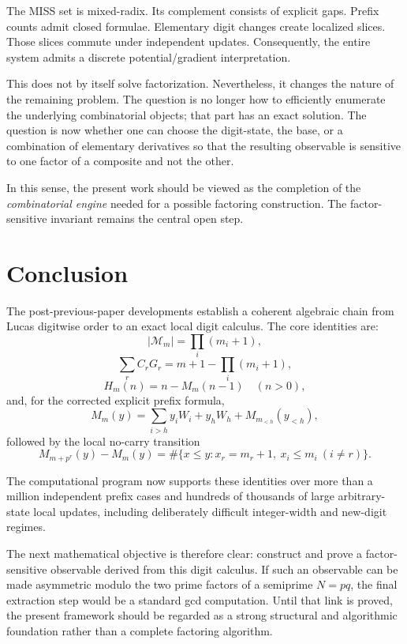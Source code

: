 \documentclass[11pt,a4paper]{article}
\theoremstyle{definition}
\theoremstyle{remark}
\newcommand{\Miss}{\mathcal M}
\begin{document}
The MISS set is mixed-radix.  Its complement consists of explicit gaps.  Prefix counts admit closed formulae.  Elementary digit changes create localized slices.  Those slices commute under independent updates.  Consequently, the entire system admits a discrete potential/gradient interpretation.

This does not by itself solve factorization.  Nevertheless, it changes the nature of the remaining problem.  The question is no longer how to efficiently enumerate the underlying combinatorial objects; that part has an exact solution.  The question is now whether one can choose the digit-state, the base, or a combination of elementary derivatives so that the resulting observable is sensitive to one factor of a composite and not the other.

In this sense, the present work should be viewed as the completion of the \emph{combinatorial engine} needed for a possible factoring construction.  The factor-sensitive invariant remains the central open step.

\section{Conclusion}

The post-previous-paper developments establish a coherent algebraic chain from Lucas digitwise order to an exact local digit calculus.  The core identities are:
\[
|\Miss_m|=\prod_i(m_i+1),
\]
\[
\sum_r C_rG_r
=m+1-\prod_i(m_i+1),
\]
\[
H_m(n)=n-M_m(n-1)\quad(n>0),
\]
and, for the corrected explicit prefix formula,
\[
M_m(y)=
\sum_{i>h}y_iW_i
+y_hW_h
+M_{m_{<h}}(y_{<h}),
\]
followed by the local no-carry transition
\[
M_{m+p^r}(y)-M_m(y)
=\#\{x\le y:x_r=m_r+1,\ x_i\le m_i\ (i\ne r)\}.
\]

The computational program now supports these identities over more than a million independent prefix cases and hundreds of thousands of large arbitrary-state local updates, including deliberately difficult integer-width and new-digit regimes.

The next mathematical objective is therefore clear: construct and prove a factor-sensitive observable derived from this digit calculus.  If such an observable can be made asymmetric modulo the two prime factors of a semiprime $N=pq$, the final extraction step would be a standard gcd computation.  Until that link is proved, the present framework should be regarded as a strong structural and algorithmic foundation rather than a complete factoring algorithm.
\end{document}

